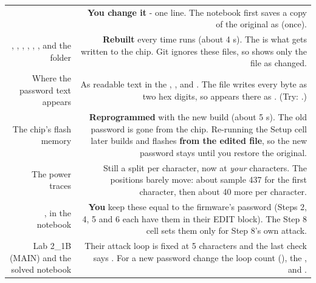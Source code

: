 \documentclass[11pt,letterpaper]{article}
\begin{document}
{\small{}
\begin{longtable}{|R{0.3188}|R{0.6812}|}
\hline
{} &  \\ \hline
\endhead
{} & \textbf{You change it} - one line. The notebook first saves a copy of the original as  (once). \\ \hline
{}, , , , , ,  and the  folder & \textbf{Rebuilt} every time  runs (about 4 s). The  is what gets written to the chip. Git ignores these files, so  shows only the  file as changed. \\ \hline
Where the password text appears & As readable text in the , ,  and . The  file writes every byte as two hex digits, so  appears there as . (Try: .) \\ \hline
The chip's flash memory & \textbf{Reprogrammed} with the new build (about 5 s). The old password is gone from the chip. Re-running the Setup cell later builds and flashes \textbf{from the edited  file}, so the new password stays until you restore the original. \\ \hline
The power traces & Still a split per character, now at \emph{your} characters. The positions barely move: about sample 437 for the first character, then about 40 more per character. \\ \hline
{},  in the notebook & \textbf{You} keep these equal to the firmware's password (Steps 2, 4, 5 and 6 each have them in their EDIT block). The Step 8 cell sets them only for Step 8's own attack. \\ \hline
Lab 2\_1B (MAIN) and the solved notebook & Their attack loop is fixed at 5 characters and the last check says . For a new password change the loop count (), the , and . \\ \hline
\end{longtable}}
\end{document}
